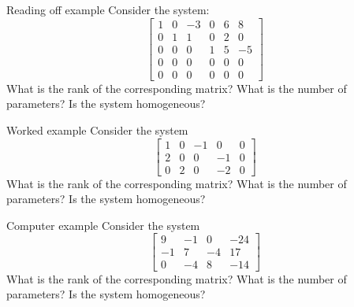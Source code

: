 \documentclass{beamer}
\begin{document}
\begin{frame}{Reading off example}
  Consider the system:
  \begin{equation*}
    \left[
      \begin{array}{rrrrr|r}
        1 & 0 & -3 & 0 & 6 & 8  \\
        0 & 1 & 1 & 0 & 2 & 0  \\
        0 & 0 & 0 & 1 & 5 & -5 \\
        0 & 0 & 0 & 0 & 0 & 0\\
        0 & 0 & 0 & 0 & 0 &0
      \end{array}\right] 
  \end{equation*}
  What is the rank of the corresponding matrix?
  What is the number of parameters?
  Is the system homogeneous?
\end{frame}

\begin{frame}{Worked example}
  Consider the system
  \begin{equation*}
    \left[
      \begin{array}{rrrr|r}
        1 & 0 & -1 & 0 & 0 \\
        2 & 0 & 0 & -1 & 0  \\
        0 & 2 & 0 & -2 & 0
      \end{array}\right] 
  \end{equation*}
  What is the rank of the corresponding matrix?
  What is the number of parameters?
  Is the system homogeneous?
\end{frame}

\begin{frame}{Computer example}
  Consider the system
  \begin{equation*}
    \left[
      \begin{array}{rrr|r}
        9 & -1 & 0 & -24  \\
        -1 & 7 & -4 & 17   \\
        0 & -4 & 8 & -14 
      \end{array}\right] 
  \end{equation*}
  What is the rank of the corresponding matrix?
  What is the number of parameters?
  Is the system homogeneous?
\end{frame}
\end{document}
